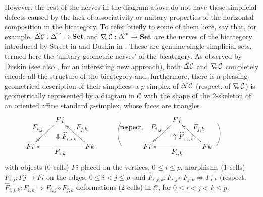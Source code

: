 \documentclass[]{amsart}
\begin{document}
However, the rest of the nerves in the diagram above do not have these simplicial defects caused by
the lack of associativity  or unitary properties of the horizontal composition in the bicategory.
To refer briefly to some of them here, say that, for example,  ${\ensuremath{\Delta}}\hspace{-4pt}^{^\mathrm{u}}{\ensuremath{\mathcal{C}}}:
\Delta^{\!{^\mathrm{op}}} \to {\ensuremath{\mathbf{Set}}}$ and $\nabla\hspace{-2.5pt}_{^{_\mathrm{u}}}{\ensuremath{\mathcal{C}}}:
\Delta^{\!{^\mathrm{op}}} \to {\ensuremath{\mathbf{Set}}}$ are the nerves of the bicategory introduced by Street in
\cite{street} and Duskin in \cite{duskin}. These are genuine single simplicial sets, termed here
the `unitary geometric nerves' of the bicategory. As observed by Duskin (see also \cite{gurski2},
for an interesting new approach), both ${\ensuremath{\Delta}}\hspace{-4pt}^{^\mathrm{u}}{\ensuremath{\mathcal{C}}}$ and
$\nabla\hspace{-2.5pt}_{^{_\mathrm{u}}}{\ensuremath{\mathcal{C}}}$ completely encode all the structure of the bicategory
and, furthermore, there is a pleasing geometrical description of their simplices: a $p$-simplex of
$\Delta^{\hspace{-2pt}^\mathrm{u}}{\ensuremath{\mathcal{C}}}$ (respect. of $\nabla\hspace{-2.5pt}_{^{_\mathrm{u}}}{\ensuremath{\mathcal{C}}}$) is
geometrically represented by a diagram in ${\ensuremath{\mathcal{C}}}$ with the shape of the 2-skeleton of an oriented
affine standard $p$-simplex, whose faces are triangles
$$
\xymatrix{\ar@{}[drr]|(.6)*+{\Downarrow \widehat{F}_{_{i,j,k}}}
                & Fj \ar[dl]_{\textstyle F_{i,j}}             \\
Fi  & &     Fk\,  \ar[ul]_{\textstyle F_{j,k}} \ar[ll]^{\textstyle F_{i,k}} }\hspace{1cm} \xymatrix{ \ar@{-}@/_0.5pc/[d]&\ar@{}[drr]|(.6)*+{\Uparrow \widehat{F}_{_{i,j,k}}} & Fj \ar[dl]_{\textstyle \text{respect. }\hspace{0.2cm}\textstyle F_{i,j}}         \\
 & Fi  & &     Fk   \ar[ul]_{\textstyle F_{j,k}} \ar[ll]^{\textstyle F_{i,k}} }  \xymatrix@R=13pt{\ar@{-}@/^0.5pc/[dd]&\\&\\&}
$$
with objects (0-cells) $Fi$  placed on the vertices, $0\leq i\leq p$, morphisms (1-cells)
$F_{i,j}:Fj\rightarrow Fi$ on the edges, $0\leq i<j\leq p$, and $\widehat{F}_{i,j,k}:F_{i,j}\circ
F_{j,k}\Rightarrow F_{i,k}$ (respect. $\widehat{F}_{i,j,k}:F_{i,k}\Rightarrow F_{i,j}\circ F_{j,k}$
deformations (2-cells) in ${\ensuremath{\mathcal{C}}}$, for $0\leq i<j<k\leq p$.
\end{document}
